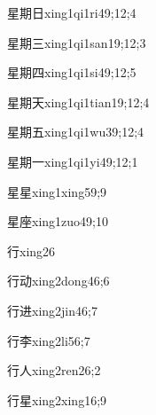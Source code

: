 \begin{verbete}{星期日}{xing1qi1ri4}{9;12;4}
\end{verbete}
\begin{verbete}{星期三}{xing1qi1san1}{9;12;3}
\end{verbete}
\begin{verbete}{星期四}{xing1qi1si4}{9;12;5}
\end{verbete}
\begin{verbete}{星期天}{xing1qi1tian1}{9;12;4}
\end{verbete}
\begin{verbete}{星期五}{xing1qi1wu3}{9;12;4}
\end{verbete}
\begin{verbete}{星期一}{xing1qi1yi4}{9;12;1}
\end{verbete}
\begin{verbete}{星星}{xing1xing5}{9;9}
\end{verbete}
\begin{verbete}{星座}{xing1zuo4}{9;10}
\end{verbete}
\begin{verbete}{行}{xing2}{6}
\end{verbete}
\begin{verbete}{行动}{xing2dong4}{6;6}
\end{verbete}
\begin{verbete}{行进}{xing2jin4}{6;7}
\end{verbete}
\begin{verbete}{行李}{xing2li5}{6;7}
\end{verbete}
\begin{verbete}{行人}{xing2ren2}{6;2}
\end{verbete}
\begin{verbete}{行星}{xing2xing1}{6;9}
\end{verbete}

